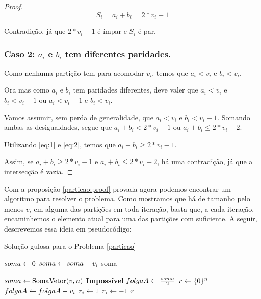 \begin{proof}
$$S_i = a_i + b_i = 2*v_i - 1$$

Contradição, já que $2*v_i - 1$ é ímpar e $S_i$ é par.

\subsubsection*{Caso 2: $a_i$ e $b_i$ tem diferentes paridades.}

Como nenhuma partição tem  para acomodar $v_i$, temos que $a_i < v_i$ e $b_i < v_i$.

Ora mas como $a_i$ e $b_i$ tem paridades diferentes, deve valer que $a_i < v_i$ e $b_i < v_i - 1$ ou $a_i < v_i - 1$ e $b_i < v_i$.

Vamos assumir, sem perda de generalidade, que $a_i < v_i$ e $b_i < v_i - 1$. Somando ambas as desigualdades, segue que $a_i + b_i < 2*v_i - 1$ ou $a_i + b_i \leq 2*v_i - 2$.

Utilizando \ref{eq:1} e \ref{eq:2}, temos que $a_i + b_i \geq 2*v_i - 1$.

Assim, se $a_i + b_i \geq 2*v_i - 1$ e $a_i + b_i \leq 2*v_i - 2$, há uma contradição, já que a intersecção é vazia.

\end{proof}

Com a proposição \ref{particao:proof} provada agora podemos encontrar um algoritmo para resolver o problema. Como mostramos que há  de tamanho pelo menos $v_i$ em alguma das partições em toda iteração, basta que, a cada iteração, encaminhemos o elemento atual para uma das partições com  suficiente. A seguir, descrevemos essa ideia em pseudocódigo:

\begin{algorithm}[h]
\caption{Solução gulosa para o Problema \ref{particao}}
\label{particao:code}
\begin{algorithmic}[1]
    \State $soma \leftarrow 0$
        \State $soma \leftarrow soma + v_i$
    \EndFor
    \State \Return soma
\EndFunction

    \State $soma \leftarrow \text{SomaVetor}(v, n)$
        \State \Return \textbf{Impossível}
    \EndIf
    \State $folgaA \leftarrow \frac{soma}{2}$
    \State $r \leftarrow \{0\}^n$
            \State $folgaA \leftarrow folgaA - v_i$
            \State $r_i \leftarrow 1$
        \Else
            \State $r_i \leftarrow -1$
        \EndIf
    \EndFor
    \State \Return $r$
\EndFunction
\end{algorithmic}
\end{algorithm}

